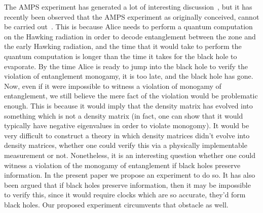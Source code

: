 \documentclass[11pt,a4paper]{article}
\begin{document}
The AMPS experiment has generated a lot of interesting discussion~\cite{marolf2013gauge,giddings2012nonviolent,susskind2012singularities,papadodimas2012infalling,bousso2013complementarity,jacobson2012boundary,banks2013no,almheiri2013apologia,maldacena2013cool,shenker2013black,mathur2013flaw,van2013evaporating,larjo2013black,lloyd2013unitarity}, but it has recently
been observed that the AMPS experiment as originally conceived, cannot be carried out~\cite{harlow2013quantum,susskind2013black}. This is because Alice needs to perform a quantum computation on the Hawking radiation in order to decode entanglement between the zone and the early Hawking radiation, and the time that it would take to perform the quantum computation is longer than the time it takes for the black hole to evaporate. By the time Alice is ready to jump into the black hole to verify the violation of entanglement monogamy, it is too late, and the black hole has gone. Now, even if it were impossible to witness a violation of monogamy of entanglement, we still believe the mere fact of the violation would be problematic enough. This is because it would imply that the density matrix has evolved into something which is not a density matrix (in fact, one can show that it would typically have negative eigenvalues in order to violate monogomy). It would be very difficult to construct a theory in which density matrices didn't evolve into density matrices, whether one could verify this via a physically implementable measurement or not. Nonetheless, it is an interesting question whether one could witness a violation of the monogamy of entanglement if black holes preserve information. In the present paper we propose an experiment to do so. It has also been argued that if black holes preserve information, then it 
may be impossible to verify this, since it would require clocks which are so accurate, they'd form black holes\cite{unruh-newton}. Our proposed experiment circumvents that obstacle as well.
\end{document}
